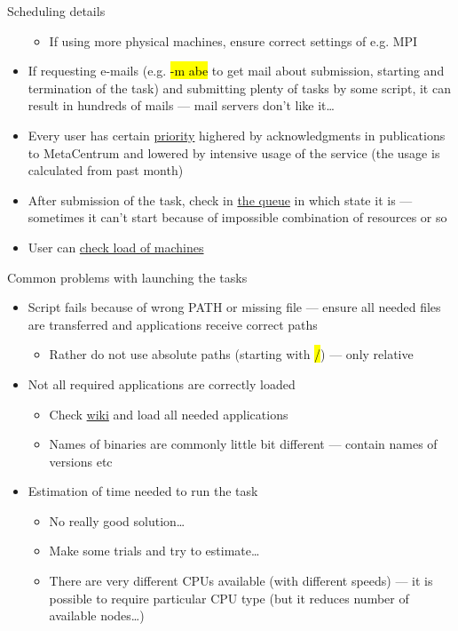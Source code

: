 \documentclass[compress, ucs, xelatex, 11pt, xcolor=svgnames,
  hyperref={
    bookmarks=true,
    unicode=true,
    colorlinks=true,
    pdftitle={Linux, command line and MetaCentrum},
    plainpages=false,
    pdfauthor={Vojtech Zeisek},
    pdfsubject={Course about use of Linux command line, writing shell scripts and using MetaCentrum of CESNET},
    pdfcreator={XeLaTeX},
    pdfkeywords={Linux, GNU, BASH, shell, command line, MetaCentrum},
    linkcolor=DarkRed,
    anchorcolor=DarkBlue,
    citecolor=Indigo,
    filecolor=NavyBlue,
    menucolor=DarkMagenta,
    urlcolor=DarkBlue,
    pdftex},
  url={hyphens, lowtilde} %
  ]{beamer}
\renewcommand{\texttt}[1]{\hl{\ttfamily #1}}
\begin{document}
\begin{frame}[allowframebreaks]{Scheduling details}
\begin{itemize}
\begin{itemize}
      \item If using more physical machines, ensure correct settings of e.g. MPI
    \end{itemize}
    \item If requesting e-mails (e.g. \texttt{-m abe} to get mail about submission, starting and termination of the task) and submitting plenty of tasks by some script, it can result in hundreds of mails --- mail servers don't like it\ldots
    \item Every user has certain \href{https://metavo.metacentrum.cz/pbsmon2/users/}{priority} highered by acknowledgments in publications to MetaCentrum and lowered by intensive usage of the service (the usage is calculated from past month)
    \item After submission of the task, check in \href{https://metavo.metacentrum.cz/pbsmon2/queues/jobsQueued}{the queue} in which state it is --- sometimes it can't start because of impossible combination of resources or so
    \item User can \href{https://metavo.metacentrum.cz/pbsmon2/nodes/physical}{check load of machines}
  \end{itemize}
\end{frame}

\begin{frame}{Common problems with launching the tasks}
  \begin{itemize}
    \item Script fails because of wrong PATH or missing file --- ensure all needed files are transferred and applications receive correct paths
    \begin{itemize}
      \item Rather do not use absolute paths (starting with \texttt{/}) --- only relative
    \end{itemize}
    \item Not all required applications are correctly loaded
    \begin{itemize}
      \item Check \href{https://wiki.metacentrum.cz/wiki/Kategorie:Applications}{wiki} and load all needed applications
      \item Names of binaries are commonly little bit different --- contain names of versions etc
    \end{itemize}
    \item Estimation of time needed to run the task
    \begin{itemize}
      \item No really good solution\ldots
      \item Make some trials and try to estimate\ldots
      \item There are very different CPUs available (with different speeds) --- it is possible to require particular CPU type (but it reduces number of available nodes\ldots)
    \end{itemize}
  \end{itemize}
\end{frame}
\end{document}
